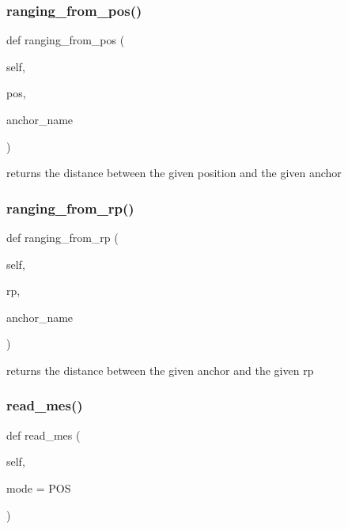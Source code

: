 \subsubsection{\texorpdfstring{ranging\+\_\+from\+\_\+pos()}{ranging\_from\_pos()}}
{\footnotesize\ttfamily def ranging\+\_\+from\+\_\+pos (\begin{DoxyParamCaption}\item[{}]{self,  }\item[{}]{pos,  }\item[{}]{anchor\+\_\+name }\end{DoxyParamCaption})}

\begin{DoxyVerb}returns the distance between the given position and the given anchor\end{DoxyVerb}
 \mbox{\label{classread_mes_1_1_measurements_a3720c2eca68a86eb32876fad24d37b65}} 
\subsubsection{\texorpdfstring{ranging\+\_\+from\+\_\+rp()}{ranging\_from\_rp()}}
{\footnotesize\ttfamily def ranging\+\_\+from\+\_\+rp (\begin{DoxyParamCaption}\item[{}]{self,  }\item[{}]{rp,  }\item[{}]{anchor\+\_\+name }\end{DoxyParamCaption})}

\begin{DoxyVerb}returns the distance between the given anchor and the given rp\end{DoxyVerb}
 \mbox{\label{classread_mes_1_1_measurements_af97d9bc67dffe24a1547fabebc31e9ad}} 
\subsubsection{\texorpdfstring{read\+\_\+mes()}{read\_mes()}}
{\footnotesize\ttfamily def read\+\_\+mes (\begin{DoxyParamCaption}\item[{}]{self,  }\item[{}]{mode = {\ttfamily \textquotesingle{}POS\textquotesingle{}} }\end{DoxyParamCaption})}

